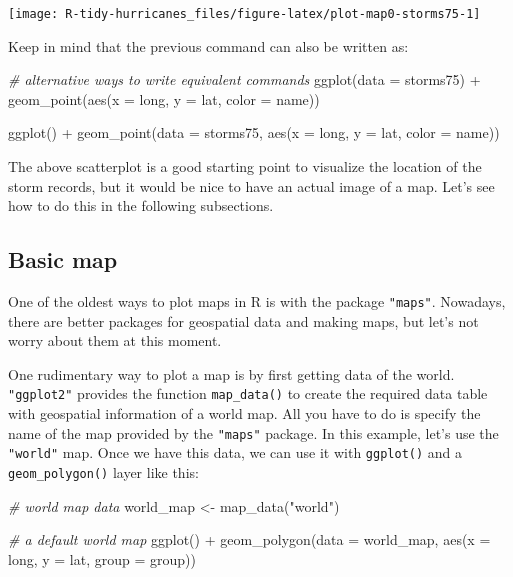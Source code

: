 \documentclass[
]{book}
\newenvironment{Shaded}{\begin{snugshade}}{\end{snugshade}}
\newcommand{\AttributeTok}[1]{\textcolor[rgb]{0.77,0.63,0.00}{#1}}
\newcommand{\CommentTok}[1]{\textcolor[rgb]{0.56,0.35,0.01}{\textit{#1}}}
\newcommand{\FunctionTok}[1]{\textcolor[rgb]{0.00,0.00,0.00}{#1}}
\newcommand{\NormalTok}[1]{#1}
\newcommand{\OtherTok}[1]{\textcolor[rgb]{0.56,0.35,0.01}{#1}}
\newcommand{\SpecialCharTok}[1]{\textcolor[rgb]{0.00,0.00,0.00}{#1}}
\newcommand{\StringTok}[1]{\textcolor[rgb]{0.31,0.60,0.02}{#1}}
\begin{document}
\begin{center}\texttt{[image: R-tidy-hurricanes\_files/figure-latex/plot-map0-storms75-1]} \end{center}

Keep in mind that the previous command can also be written as:

\begin{Shaded}
\begin{Highlighting}[]
\CommentTok{\# alternative ways to write equivalent commands}
\FunctionTok{ggplot}\NormalTok{(}\AttributeTok{data =}\NormalTok{ storms75) }\SpecialCharTok{+}  
  \FunctionTok{geom\_point}\NormalTok{(}\FunctionTok{aes}\NormalTok{(}\AttributeTok{x =}\NormalTok{ long, }\AttributeTok{y =}\NormalTok{ lat, }\AttributeTok{color =}\NormalTok{ name))}

\FunctionTok{ggplot}\NormalTok{() }\SpecialCharTok{+}  
  \FunctionTok{geom\_point}\NormalTok{(}\AttributeTok{data =}\NormalTok{ storms75, }\FunctionTok{aes}\NormalTok{(}\AttributeTok{x =}\NormalTok{ long, }\AttributeTok{y =}\NormalTok{ lat, }\AttributeTok{color =}\NormalTok{ name))}
\end{Highlighting}
\end{Shaded}

The above scatterplot is a good starting point to visualize the location of the
storm records, but it would be nice to have an actual image of a map. Let's
see how to do this in the following subsections.

\hypertarget{basic-map}{%
\subsection{Basic map}\label{basic-map}}

One of the oldest ways to plot maps in R is with the package \texttt{"maps"}. Nowadays,
there are better packages for geospatial data and making maps, but let's not
worry about them at this moment.

One rudimentary way to plot a map is by first getting data of the world.
\texttt{"ggplot2"} provides the function \texttt{map\_data()} to create the required data
table with geospatial information of a world map. All you have to do is specify
the name of the map provided by the \texttt{"maps"} package. In this example, let's
use the \texttt{"world"} map. Once we have this data, we can use it with \texttt{ggplot()}
and a \texttt{geom\_polygon()} layer like this:

\begin{Shaded}
\begin{Highlighting}[]
\CommentTok{\# world map data}
\NormalTok{world\_map }\OtherTok{\textless{}{-}} \FunctionTok{map\_data}\NormalTok{(}\StringTok{"world"}\NormalTok{)}

\CommentTok{\# a default world map}
\FunctionTok{ggplot}\NormalTok{() }\SpecialCharTok{+} 
  \FunctionTok{geom\_polygon}\NormalTok{(}\AttributeTok{data =}\NormalTok{ world\_map, }
               \FunctionTok{aes}\NormalTok{(}\AttributeTok{x =}\NormalTok{ long, }\AttributeTok{y =}\NormalTok{ lat, }\AttributeTok{group =}\NormalTok{ group))}
\end{Highlighting}
\end{Shaded}
\end{document}
